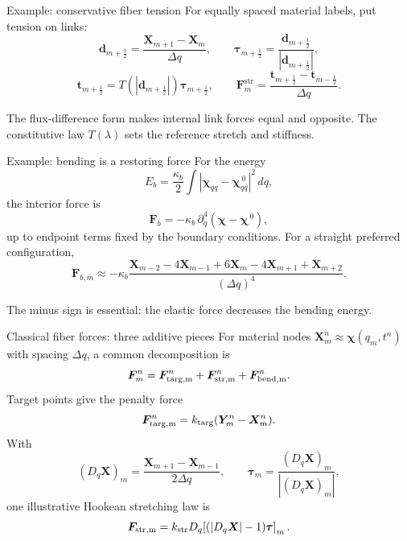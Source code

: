 \documentclass[aspectratio=169,11pt]{beamer}
\newcommand{\Xvec}{\bm{X}}
\newcommand{\Fvec}{\bm{F}}
\begin{document}
\begin{frame}{Example: conservative fiber tension}
For equally spaced material labels, put tension on links:
\[
  \bm{d}_{m+\frac12}=\frac{\Xvec_{m+1}-\Xvec_m}{\Delta q},
  \qquad
  \bm{\tau}_{m+\frac12}=\frac{\bm{d}_{m+\frac12}}{|\bm{d}_{m+\frac12}|},
\]
\[
  \bm{t}_{m+\frac12}=T\!\left(|\bm{d}_{m+\frac12}|\right)\bm{\tau}_{m+\frac12},
  \qquad
  \boxed{\Fvec_m^{\mathrm{str}}
  =\frac{\bm{t}_{m+\frac12}-\bm{t}_{m-\frac12}}{\Delta q}}.
\]
\begin{punchbox}
The flux-difference form makes internal link forces equal and opposite. The constitutive law $T(\lambda)$ sets the reference stretch and stiffness.
\end{punchbox}
\vspace{3pt}
\end{frame}

\begin{frame}{Example: bending is a restoring force}
For the energy
\[
  E_b=\frac{\kappa_b}{2}\int
  |\boldsymbol{\chi}_{qq}-\boldsymbol{\chi}^{\,0}_{qq}|^2\,dq,
\]
the interior force is
\[
  \Fvec_b=-\kappa_b\,\partial_q^4
  (\boldsymbol{\chi}-\boldsymbol{\chi}^{\,0}),
\]
up to endpoint terms fixed by the boundary conditions. For a straight preferred configuration,
\[
  \Fvec_{b,m}\approx-\kappa_b
  \frac{\Xvec_{m-2}-4\Xvec_{m-1}+6\Xvec_m-4\Xvec_{m+1}+\Xvec_{m+2}}
       {(\Delta q)^4}.
\]
\begin{punchbox}
The minus sign is essential: the elastic force decreases the bending energy.
\end{punchbox}
\end{frame}

\begin{frame}{Classical fiber forces: three additive pieces}
\small
For material nodes $\Xvec_m^n\approx\boldsymbol\chi(q_m,t^n)$ with spacing $\Delta q$, a common decomposition is
\[
 \Fvec_m^n=\Fvec_{\rm targ,m}^n+\Fvec_{\rm str,m}^n+\Fvec_{\rm bend,m}^n.
\]
Target points give the penalty force
\[
 \Fvec_{\rm targ,m}^n=k_{\rm targ}(\bm Y_m^n-\Xvec_m^n).
\]
With
\[
 (D_q\Xvec)_m=\frac{\Xvec_{m+1}-\Xvec_{m-1}}{2\Delta q},
 \qquad \bm\tau_m=\frac{(D_q\Xvec)_m}{|(D_q\Xvec)_m|},
\]
one illustrative Hookean stretching law is
\[
 \Fvec_{\rm str,m}=k_{\rm str}D_q\!\left[(|D_q\Xvec|-1)\bm\tau\right]_m.
\]
\end{frame}
\end{document}
